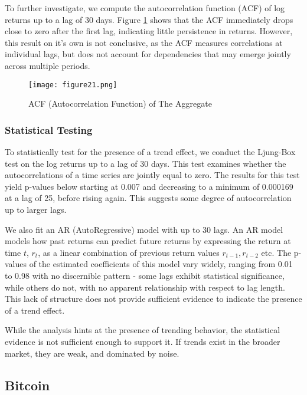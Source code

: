 \documentclass[
]{article}
\begin{document}
To further investigate, we compute the autocorrelation function (ACF) of
log returns up to a lag of 30 days. Figure
\textcolor{blue}{\ref{fig:21}} shows that the ACF immediately drops
close to zero after the first lag, indicating little persistence in
returns. However, this result on it's own is not conclusive, as the ACF
measures correlations at individual lags, but does not account for
dependencies that may emerge jointly across multiple periods.

\begin{figure}[H]
    \centering
    \texttt{[image: figure21.png]}
    \caption{ACF (Autocorrelation Function) of The Aggregate}
    \label{fig:21}
\end{figure}

\subsubsection{Statistical Testing}\label{statistical-testing-4}

To statistically test for the presence of a trend effect, we conduct the
Ljung-Box test on the log returns up to a lag of 30 days. This test
examines whether the autocorrelations of a time series are jointly equal
to zero. The results for this test yield p-values below starting at
0.007 and decreasing to a minimum of 0.000169 at a lag of 25, before
rising again. This suggests some degree of autocorrelation up to larger
lags.

We also fit an AR (AutoRegressive) model with up to 30 lags. An AR model
models how past returns can predict future returns by expressing the
return at time \(t\), \(r_t\), as a linear combination of previous
return values \(r_{t-1}, r_{t-2}\) etc. The p-values of the estimated
coefficients of this model vary widely, ranging from 0.01 to 0.98 with
no discernible pattern - some lags exhibit statistical significance,
while others do not, with no apparent relationship with respect to lag
length. This lack of structure does not provide sufficient evidence to
indicate the presence of a trend effect.

While the analysis hints at the presence of trending behavior, the
statistical evidence is not sufficient enough to support it. If trends
exist in the broader market, they are weak, and dominated by noise.

\subsection{Bitcoin}\label{bitcoin-2}
\end{document}
